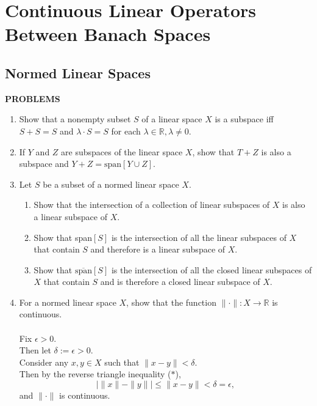 \chapter{Continuous Linear Operators Between Banach Spaces}

\section{Normed Linear Spaces}


\begin{center}
	\textbf{PROBLEMS}
\end{center}
\begin{enumerate}
	\setcounter{enumi}{0}
    \item Show that a nonempty subset $S$ of a linear space $X$ is a subspace iff $S+S=S$ and $\lambda \cdot S=S$ for each $\lambda\in\mathbb{R},\lambda\neq0$.
    \item If $Y$ and $Z$ are subspaces of the linear space $X$, show that $T+Z$ is also a subspace and $Y+Z=\text{span}[Y\cup Z]$. 
    \item Let $S$ be a subset of a normed linear space $X$.
    \begin{enumerate}[label=(\roman*),align=left]
        \item Show that the intersection of a collection of linear subspaces of $X$ is also a linear subspace of $X$.
        \item Show that span$[S]$ is the intersection of all the linear subspaces of $X$ that contain $S$ and therefore is a linear subspace of $X$.
        \item Show that $\overline{\text{span}}[S]$ is the intersection of all the closed linear subspaces of $X$ that contain $S$ and is therefore a closed linear subspace of $X$. 
    \end{enumerate}
    \item For a normed linear space $X$, show that the function $\|\cdot\|:X\to\mathbb{R}$ is continuous.\\
    \\Fix $\epsilon>0$.
    \\Then let $\delta:=\epsilon>0$.
    \\Consider any $x,y\in X$ such that $\|x-y\|<\delta$.
    \\Then by the reverse triangle inequality ($\ast$),
    \[
        |\|x\|-\|y\||\le\|x-y\|<\delta=\epsilon,
    \]
    and $\|\cdot\|$ is continuous.\\

\end{enumerate}
